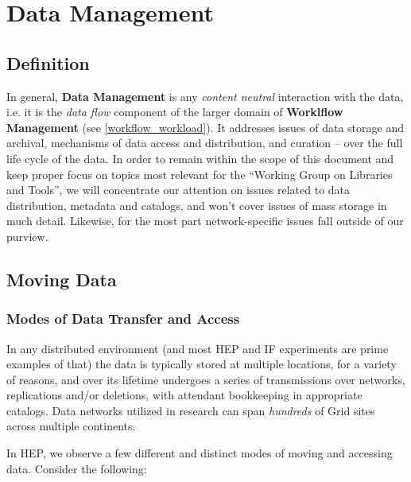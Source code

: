 \section{Data Management}
\label{data}


\subsection{Definition}
In general, \textbf{Data Management} is any \textit{content neutral} interaction with the data, i.e. it is the \textit{data flow}
component of the larger domain of  \textbf{Worklflow Management} (see \ref{workflow_workload}). It addresses issues of data storage
and archival, mechanisms of data access and distribution, and  curation -- over the full life cycle of the data. In order to remain within
the scope of this document and keep  proper focus on topics most relevant for the ``Working Group on Libraries and Tools'', we will
concentrate our attention on issues related to data distribution, metadata and catalogs, and won't cover issues of mass storage
in much detail. Likewise, for the most part network-specific issues fall outside of our purview.



\subsection{Moving Data}
\subsubsection{Modes of Data Transfer and Access}
In any distributed environment (and most HEP and IF experiments are prime examples of that) the data is typically stored at multiple locations,
for a variety of reasons, and over its lifetime undergoes a series of transmissions over networks, replications and/or deletions, with attendant bookkeeping
in appropriate catalogs. Data networks utilized in research can span \textit{hundreds} of Grid sites across multiple continents.

In HEP, we observe a few different and distinct modes of moving and accessing data. Consider the following:

